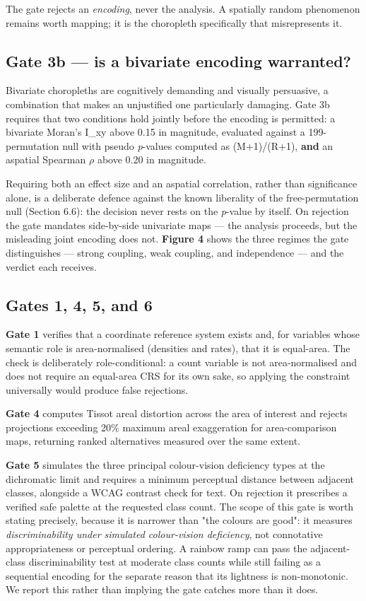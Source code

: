 The gate rejects an \emph{encoding}, never the analysis. A spatially random phenomenon remains worth mapping; it is the choropleth specifically that misrepresents it.

\subsection{Gate 3b --- is a bivariate encoding warranted?}
Bivariate choropleths are cognitively demanding and visually persuasive, a combination that makes an unjustified one particularly damaging. Gate 3b requires that two conditions hold jointly before the encoding is permitted: a bivariate Moran's I\_xy above 0.15 in magnitude, evaluated against a 199-permutation null with pseudo \emph{p}-values computed as (M+1)/(R+1), \textbf{and} an aspatial Spearman $\rho$ above 0.20 in magnitude.

Requiring both an effect size and an aspatial correlation, rather than significance alone, is a deliberate defence against the known liberality of the free-permutation null (Section 6.6): the decision never rests on the \emph{p}-value by itself. On rejection the gate mandates side-by-side univariate maps --- the analysis proceeds, but the misleading joint encoding does not. \textbf{Figure 4} shows the three regimes the gate distinguishes --- strong coupling, weak coupling, and independence --- and the verdict each receives.

\subsection{Gates 1, 4, 5, and 6}
\textbf{Gate 1} verifies that a coordinate reference system exists and, for variables whose semantic role is area-normalised (densities and rates), that it is equal-area. The check is deliberately role-conditional: a count variable is not area-normalised and does not require an equal-area CRS for its own sake, so applying the constraint universally would produce false rejections.

\textbf{Gate 4} computes Tissot areal distortion across the area of interest and rejects projections exceeding 20\% maximum areal exaggeration for area-comparison maps, returning ranked alternatives measured over the same extent.

\textbf{Gate 5} simulates the three principal colour-vision deficiency types at the dichromatic limit and requires a minimum perceptual distance between adjacent classes, alongside a WCAG contrast check for text. On rejection it prescribes a verified safe palette at the requested class count. The scope of this gate is worth stating precisely, because it is narrower than "the colours are good": it measures \emph{discriminability under simulated colour-vision deficiency}, not connotative appropriateness or perceptual ordering. A rainbow ramp can pass the adjacent-class discriminability test at moderate class counts while still failing as a sequential encoding for the separate reason that its lightness is non-monotonic. We report this rather than implying the gate catches more than it does.

